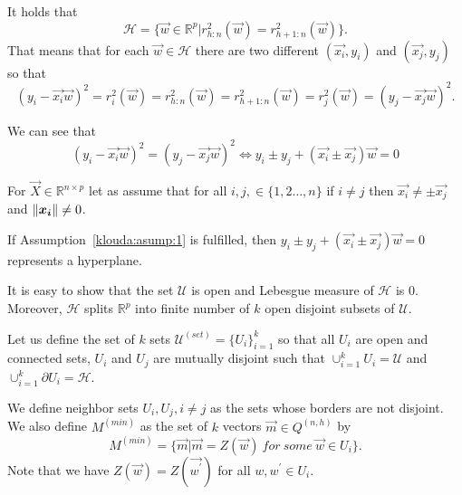 \begin{corollary}
    It holds that
    \begin{equation}
        \mathcal{H} = \{{ \vec{w} \in \mathbb{R}^{p} | r^{2}_{h:n}(\vec{w}) = r^{2}_{h+1:n}(\vec{w}) \}}.
    \end{equation}
    That means that for each $\vec{w} \in \mathcal{H}$ there are two different $(\vec{x_i}, y_i)$ and  $(\vec{x_j}, y_j)$ so that
    \begin{equation}
        (y_i - \vec{x_i} \vec{w})^2 = r^{2}_i(\vec{w}) =  r^{2}_{h:n}(\vec{w}) = r^{2}_{h+1:n}(\vec{w}) =  r^{2}_j(\vec{w}) = (y_j - \vec{x_j} \vec{w})^2.
    \end{equation}

    We can see that 
    \begin{equation}
        (y_i - \vec{x_i} \vec{w})^2 =  (y_j - \vec{x_j} \vec{w})^2 \iff      y_i \pm y_j + (\vec{x_i} \pm \vec{x_j})  \vec{w} = 0
    \end{equation}
\end{corollary}


\begin{assumption} \label{klouda:asump:1}
    For $\vec{X} \in \mathbb{R}^{n \times p}$ let as assume that for all $i,j, \in \{{1,2 \ldots, n \}}$  if $ i \neq j$ then $\vec{x_i} \neq \pm \vec{x_j}$ and $\left\lVert\boldsymbol{x_i}\right\rVert \neq 0$.
\end{assumption}

If Assumption~\ref{klouda:asump:1} is fulfilled, then $ y_i \pm y_j + (\vec{x_i} \pm \vec{x_j})  \vec{w} = 0$ represents a hyperplane. 

It is easy to show that the set $\mathcal{U}$ is open and Lebesgue measure of $\mathcal{H}$  is $0$. Moreover, $\mathcal{H}$ splits $\mathbb{R}^{p}$ into finite number of $k$ open disjoint subsets of $\mathcal{U}$. 




\begin{definition}
    Let us define the set of $k$ sets $\mathcal{U}^{(set)} = \{{ U_i\}}_{i=1}^{k}$ so that
    all $U_i$ are open and connected sets, $U_i$ and $U_j$ are mutually disjoint such that $\cup_{i=1}^{k}    U_i = \mathcal{U}$ and $\cup_{i=1}^{k}    \partial U_i =  \mathcal{H}$.

    We define neighbor sets $U_i, U_j, i \neq j$ as the sets whose borders are not disjoint. 
    We also define $M^{(min)}$ as the set of $k$ vectors $\vec{m} \in Q^{(n,h)}$ by 
    \begin{equation*}
        M^{(min)} = \{{ \vec{m} | \vec{m} = Z(\vec{w})~for~some~\vec{w} \in U_i  \}}.
    \end{equation*}
    Note that we have $Z(\vec{w}) = Z(\vec{w^{\prime}})$ for all $w, w^{\prime} \in U_i$.
\end{definition}

